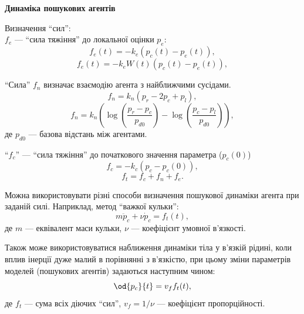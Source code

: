 \documentclass[14pt,handout,utf8]{beamer}
\newcommand{\Xhead}[1]{
 \begin{center}%
      \textbf{#1}%
 \end{center}%
}
\begin{document}
\begin{frame}
  \frametitle{~}

  \Xhead{Динаміка пошукових агентів}

  Визначення ``сил'': \\
  $f_e$ ---
  ``сила тяжіння'' до локальної оцінки $p_e$:
  \begin{equation}
    f_e(t) = - k_e \left( p_c(t) - p_e(t) \right)  ,
    \label{atu:eq:f_e_lin}
  \end{equation}
  \begin{equation}
    f_e(t) = - k_e W(t) \left( p_c(t) - p_e(t) \right) ,
    \label{atu:eq:f_e_lin_W}
  \end{equation}

  ``Сила'' $f_n$ визначає взаємодію агента з найближчими сусідами.
  \begin{equation}
    f_n = k_n ( p_r - 2 p_c + p_l ),
    \label{atu:eq:f_n_lin}
  \end{equation}
  \begin{equation}
    f_n = k_n \left( \log\left( \frac{p_r-p_c}{p_{d0}} \right) -  \log\left( \frac{p_c-p_l}{p_{d0}}\right) \right),
    \label{atu:eq:f_n_log}
  \end{equation}
  де
  $p_{d0}$ ---
  базова відстань між агентами.

 ``$f_c$'' --- ``сила тяжіння'' до початкового значення параметра ($p_{c}(0)$)
  \begin{equation}
    f_c = -k_c (p_c - p_{c}(0)) ,
    \label{atu:eq:f_c}
  \end{equation}
  \begin{equation}
  f_t = f_c + f_n + f_e .
  \label{atu:eq:f_t}
\end{equation}

  Можна використовувати різні способи визначення пошукової динаміки агента при
  заданій силі. Наприклад, метод ``важкої кульки'':
  \begin{equation}
    m \ddot{p}_c + \nu \dot{p}_c = f_t(t),
    \label{atu:eq:heavy_ball}
  \end{equation}
  де $m$ --- еквівалент маси кульки, $\nu$ --- коефіцієнт умовної в'язкості.

  Також може використовуватися наближення динаміки тіла у в'язкій рідині, коли
  вплив інерції дуже малий в порівнянні з в'язкістю, при цьому зміни параметрів
  моделей (пошукових агентів) задаються наступним чином:
  \begin{equation}
    \od{p_c}{t} = v_f f_t(t),
    \label{atu:eq:v_f}
  \end{equation}
  де $f_t$ --- сума всіх діючих ``сил'',
  $v_f = 1 / \nu$ --- коефіцієнт
  пропорційності.
\end{frame}
\end{document}
